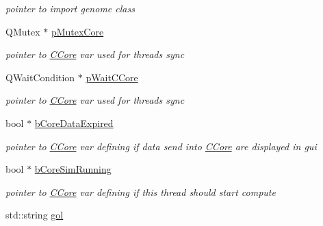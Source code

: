 \begin{DoxyCompactItemize}
\begin{DoxyCompactList}\small\item\em pointer to import genome class \item\end{DoxyCompactList}\item 
\hypertarget{classCThreadCore_a6b038d21e01e0ccfa5fe741cb42cd29b}{
QMutex $\ast$ \hyperlink{classCThreadCore_a6b038d21e01e0ccfa5fe741cb42cd29b}{pMutexCore}}
\label{classCThreadCore_a6b038d21e01e0ccfa5fe741cb42cd29b}

\begin{DoxyCompactList}\small\item\em pointer to \hyperlink{classCCore}{CCore} var used for threads sync \item\end{DoxyCompactList}\item 
\hypertarget{classCThreadCore_a8bd4c7324c6d5daa73b1d7a8b3c7799a}{
QWaitCondition $\ast$ \hyperlink{classCThreadCore_a8bd4c7324c6d5daa73b1d7a8b3c7799a}{pWaitCCore}}
\label{classCThreadCore_a8bd4c7324c6d5daa73b1d7a8b3c7799a}

\begin{DoxyCompactList}\small\item\em pointer to \hyperlink{classCCore}{CCore} var used for threads sync \item\end{DoxyCompactList}\item 
\hypertarget{classCThreadCore_aaaa0f369415f94bafde05c09ee4467c6}{
bool $\ast$ \hyperlink{classCThreadCore_aaaa0f369415f94bafde05c09ee4467c6}{bCoreDataExpired}}
\label{classCThreadCore_aaaa0f369415f94bafde05c09ee4467c6}

\begin{DoxyCompactList}\small\item\em pointer to \hyperlink{classCCore}{CCore} var defining if data send into \hyperlink{classCCore}{CCore} are displayed in gui \item\end{DoxyCompactList}\item 
\hypertarget{classCThreadCore_aec58c27de7ab78615bb759ecb5c5d5dd}{
bool $\ast$ \hyperlink{classCThreadCore_aec58c27de7ab78615bb759ecb5c5d5dd}{bCoreSimRunning}}
\label{classCThreadCore_aec58c27de7ab78615bb759ecb5c5d5dd}

\begin{DoxyCompactList}\small\item\em pointer to \hyperlink{classCCore}{CCore} var defining if this thread should start compute \item\end{DoxyCompactList}\item 
\hypertarget{classCThreadCore_a806a6c3785b9729b6f8013aab99fd0df}{
std::string \hyperlink{classCThreadCore_a806a6c3785b9729b6f8013aab99fd0df}{gol}}
\label{classCThreadCore_a806a6c3785b9729b6f8013aab99fd0df}


\end{DoxyCompactItemize}
